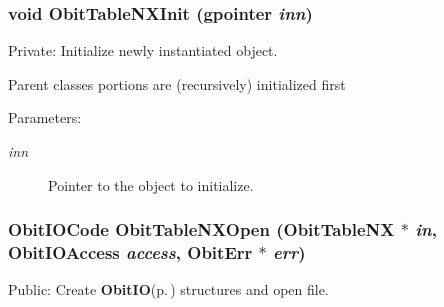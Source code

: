 \subsubsection{\setlength{\rightskip}{0pt plus 5cm}void Obit\-Table\-NXInit (gpointer {\em inn})}\label{ObitTableNX_8c_a8}


Private: Initialize newly instantiated object. 

Parent classes portions are (recursively) initialized first \begin{Desc}
\item[Parameters:]
\begin{description}
\item[{\em inn}]Pointer to the object to initialize. \end{description}
\end{Desc}
\subsubsection{\setlength{\rightskip}{0pt plus 5cm}Obit\-IOCode Obit\-Table\-NXOpen ({\bf Obit\-Table\-NX} $\ast$ {\em in}, Obit\-IOAccess {\em access}, {\bf Obit\-Err} $\ast$ {\em err})}\label{ObitTableNX_8c_a21}


Public: Create {\bf Obit\-IO}{\rm (p.\,\pageref{structObitIO})} structures and open file. 

